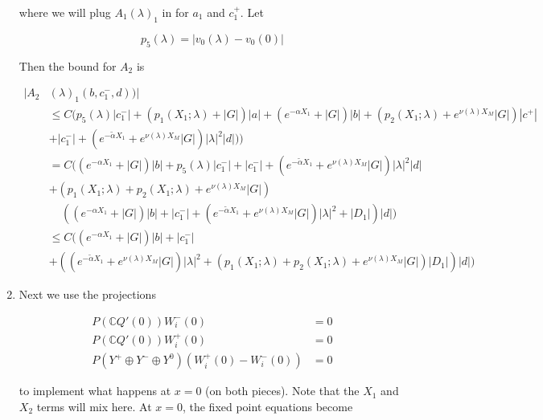 \documentclass[12pt]{article}
\def\C{{\mathbb C}}
\begin{document}
\begin{enumerate}
where we will plug $A_1(\lambda)_1$ in for $a_1$ and $c_1^+$. Let 

\[
p_5(\lambda) = |v_0(\lambda) - v_0(0)| 
\]

Then the bound for $A_2$ is

\begin{align*}
|A_2&(\lambda)_1(b, c_1^-, d))| \\
&\leq C( p_5(\lambda) |c_1^-| + (p_1(X_1; \lambda) + |G|)|a| + (e^{-\alpha X_1} + |G|) |b| + ( p_2(X_1; \lambda) + e^{\nu(\lambda)X_M} |G|) |c^+| \\
&+ |c_1^-| + (e^{-\tilde{\alpha} X_1} + e^{\nu(\lambda)X_M} |G|) |\lambda|^2 |d| ) ) \\
&= C( (e^{-\alpha X_1} + |G|) |b| + p_5(\lambda) |c_1^-| + |c_1^-| + (e^{-\tilde{\alpha} X_1} + e^{\nu(\lambda)X_M} |G|) |\lambda|^2 |d| \\
&+ (p_1(X_1; \lambda) + p_2(X_1; \lambda) + e^{\nu(\lambda)X_M} |G|) \\
&\:\:\:\:\:( ( e^{-\alpha X_1} + |G|) |b| + |c_1^-| + (e^{-\tilde{\alpha} X_1} + e^{\nu(\lambda)X_M} |G|) |\lambda|^2 + |D_1|) |d| )\\
&\leq C( (e^{-\alpha X_1} + |G|) |b| + |c_1^-| \\
&+ ((e^{-\tilde{\alpha} X_1} + e^{\nu(\lambda)X_M} |G|) |\lambda|^2 + (p_1(X_1; \lambda) + p_2(X_1; \lambda) + e^{\nu(\lambda)X_M} |G|)|D_1|)|d| )
\end{align*}

\item Next we use the projections 

\begin{align*}
P(\C Q'(0))W_i^-(0) &= 0 \\
P(\C Q'(0))W_i^+(0) &= 0 \\
P(Y^+ \oplus Y^- \oplus Y^0) ( W_i^+(0) - W_i^-(0) ) &= 0
\end{align*}

to implement what happens at $x = 0$ (on both pieces). Note that the $X_1$ and $X_2$ terms will mix here. At $x = 0$, the fixed point equations become


\end{enumerate}
\end{document}
